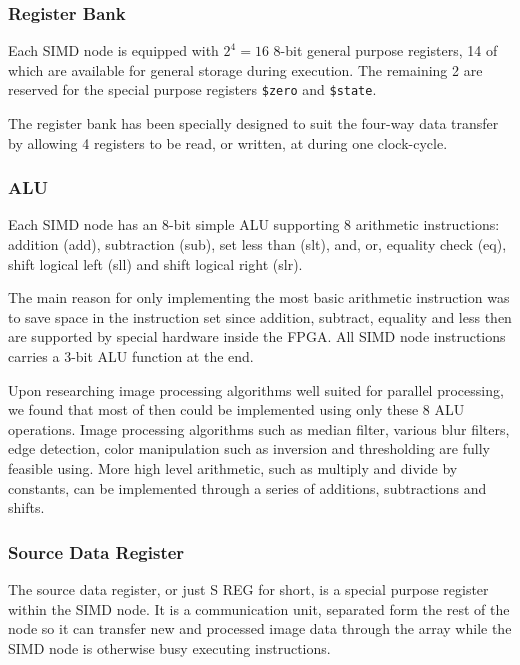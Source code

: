 \subsubsection{Register Bank}
Each \ac{SIMD} node is equipped with $2^4 = 16$ 8-bit general purpose registers, 14 of
which are available for general storage during execution. The remaining 2 are
reserved for the special purpose registers {\tt \$zero} and {\tt \$state}.



The register bank has been specially designed to suit the four-way data transfer by
allowing 4 registers to be read, or written, at during one clock-cycle.

\subsubsection{ALU}
Each \ac{SIMD} node has an 8-bit simple ALU supporting 8 arithmetic instructions: 
addition ({\sc add}), subtraction ({\sc sub}), set less than ({\sc slt}), {\sc and}, 
{\sc or}, equality check ({\sc eq}), shift logical left ({\sc sll}) and shift logical 
right ({\sc slr}). 

The main reason for only implementing the most basic arithmetic instruction was to save
space in the instruction set since addition, subtract, equality and less then are 
supported by special hardware inside the FPGA. All \ac{SIMD} node instructions carries
a 3-bit \ac{ALU} function at the end.

Upon researching image processing algorithms well suited for parallel processing, we
found that most of then could be implemented using only these 8 \ac{ALU} operations. 
Image processing algorithms such as median filter, various blur filters, edge detection, 
color manipulation such as inversion and thresholding are fully feasible using. More high
level arithmetic, such as multiply and divide by constants, can be implemented
through a series of additions, subtractions and shifts.


\subsubsection{Source Data Register}
The source data register, or just S REG for short, is a special purpose
register within the \ac{SIMD} node. It is a communication unit, separated form
the rest of the node so it can transfer new and processed image data through the
array while the \ac{SIMD} node is otherwise busy executing instructions.

